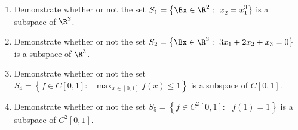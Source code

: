 
\begin{enumerate}
\item Demonstrate whether or not the set $\displaystyle{S_1=\left\{\Bx \in \R^2 :\mbox{ }x_2^{} = x_1^3\right\}}$ is a subspace of $\R^2$.
\\
\item Demonstrate whether or not the set $\displaystyle{S_2=\left\{\Bx \in \R^3 :\mbox{ }3x_1 + 2x_2 + x_3 = 0\right\}}$ is a subspace of $\R^3$.
\\
\item Demonstrate whether or not the set $\displaystyle{S_4=\left\{f \in C[0,1]:\mbox{ }\max_{x\in[0,1]} f(x) \le 1\right\}}$ is a subspace of $C[0,1]$.
\\
\item Demonstrate whether or not the set $\displaystyle{S_5=\left\{f \in C^2[0,1]:\mbox{ }f(1) = 1\right\}}$ is a subspace of $C^2[0,1]$.
\\
\end{enumerate}




